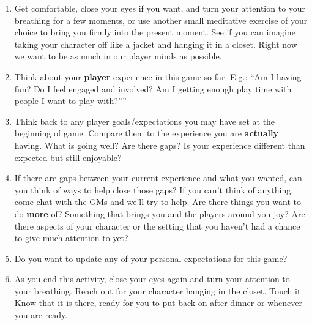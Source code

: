 \documentclass[green]{GL2020}
\begin{document}
\begin{enumerate}
	\item Get comfortable, close your eyes if you want, and turn your attention to your breathing for a few moments, or use another small meditative exercise of your choice to bring you firmly into the present moment. See if you can imagine taking your character off like a jacket and hanging it in a closet. Right now we want to be as much in our player minds as possible. 
	\item Think about your \textbf{player} experience in this game so far. E.g.: ``Am I having fun? Do I feel engaged and involved? Am I getting enough play time with people I want to play with?”''
	\item Think back to any player goals/expectations you may have set at the beginning of game. Compare them to the experience you are \textbf{actually} having. What is going well? Are there gaps? Is your experience different than expected but still enjoyable? 
	\item If there are gaps between your current experience and what you wanted, can you think of ways to help close those gaps? If you can’t think of anything, come chat with the GMs and we’ll try to help. Are there things you want to do \textbf{more} of? Something that brings you and the players around you joy? Are there aspects of your character or the setting that you haven’t had a chance to give much attention to yet?
	\item Do you want to update any of your personal expectations for this game?
	\item As you end this activity, close your eyes again and turn your attention to your breathing. Reach out for your character hanging in the closet. Touch it. Know that it is there, ready for you to put back on after dinner or whenever you are ready.
\end{enumerate}
\end{document}
